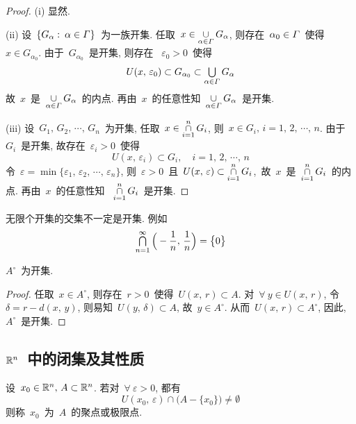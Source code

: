 \begin{proof}
(i) 显然.

(ii) 设~$\{G_\alpha: \: \alpha \in \mathnormal{\Gamma}\}$~为一族开集. 任取~$x \in \mathop{\cup}\limits_{\alpha \in \mathnormal{\Gamma}} G_\alpha$, 则存在~$\alpha_0 \in \mathnormal{\Gamma}$~使得~$x \in G_{\alpha_0}$.  由于~$G_{\alpha_0}$~是开集, 则存在~
$\varepsilon_0 > 0$~使得
\[
U(x,\,\varepsilon_0) \subset G_{\alpha_0} \subset \mathop{\textstyle{\bigcup}}_{\alpha \in \mathnormal{\Gamma}} G_\alpha
\]
故~$x$~是~$\mathop{\cup}\limits_{\alpha \in \mathnormal{\Gamma}} G_\alpha$~的内点.  再由~$x$~的任意性知~$\mathop{\cup}\limits_{\alpha \in \mathnormal{\Gamma}} G_\alpha$~是开集.

(iii) 设~$G_1,\,G_2,\,\cdots,\,G_n$~为开集, 任取~$x \in \mathop{\cap}\limits_{i=1}^n G_i$,
则~$x \in G_i,\, i=1,\,2,\,\cdots,\,n$. 由于~$G_i$~是开集, 故存在~$\varepsilon_i > 0$~使得
\[
U(x,\,\varepsilon_i) \subset G_i, \quad i = 1,\,2,\,\cdots,\,n
\]
令~$\varepsilon = \min\{\varepsilon_1,\,\varepsilon_2,\,\cdots,\,\varepsilon_n\}$, 则~$\varepsilon > 0$~且~$U(x,\,\varepsilon) \subset \mathop{\cap}\limits_{i=1}^n G_i$,\  故~$x$~是~$\mathop{\cap}\limits_{i=1}^n G_i$~的内点. 再由~$x$~的任意性知
~$\mathop{\cap}\limits_{i=1}^n G_i$~是开集.
\end{proof}

\begin{remark}
无限个开集的交集不一定是开集. 例如
\[
\mathop{\textstyle{\bigcap}}\limits_{n=1}^\infty \Big(-\frac{1}{n},\,\frac{1}{n}\Big) = \big\{0\big\}
\]
\end{remark}

\begin{theorem}
$A^\circ$~为开集.
\end{theorem}

\begin{proof}
任取~$x \in A^\circ$, 则存在~$r > 0$~使得~$U(x,\,r) \subset A$. 对~$\forall~y \in U(x,\,r)$, 令~$\delta = r - d(x,\,y)$, 则易知~$U(y,\,\delta) \subset A$, 故~$y \in A^\circ$. 从而~$U(x,\,r) \subset A^\circ$, 因此, $A^\circ$~是开集.
\end{proof}

\subsection{$\mathbb{R}^n$~中的闭集及其性质}

\begin{definition}
设~$x_0 \in \mathbb{R}^n, \, A \subset \mathbb{R}^n$. 若对~$\forall~\varepsilon > 0$, 都有
\[
U(x_0,\,\varepsilon) \cap \big(A - \{x_0\}\big) \neq \emptyset
\]
则称~$x_0$~为~$A$~的聚点或极限点.
\end{definition}

